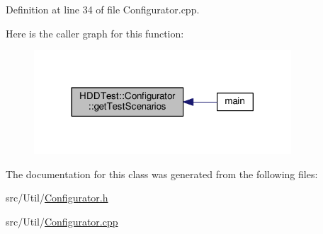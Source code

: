 Definition at line 34 of file Configurator.\-cpp.



Here is the caller graph for this function\-:\nopagebreak
\begin{figure}[H]
\begin{center}
\leavevmode
\includegraphics[width=272pt]{class_h_d_d_test_1_1_configurator_a77eb045da43a5c8ffde204f8e86e9e9e_icgraph}
\end{center}
\end{figure}




The documentation for this class was generated from the following files\-:\begin{DoxyCompactItemize}
\item 
src/\-Util/\hyperlink{_configurator_8h}{Configurator.\-h}\item 
src/\-Util/\hyperlink{_configurator_8cpp}{Configurator.\-cpp}\end{DoxyCompactItemize}
